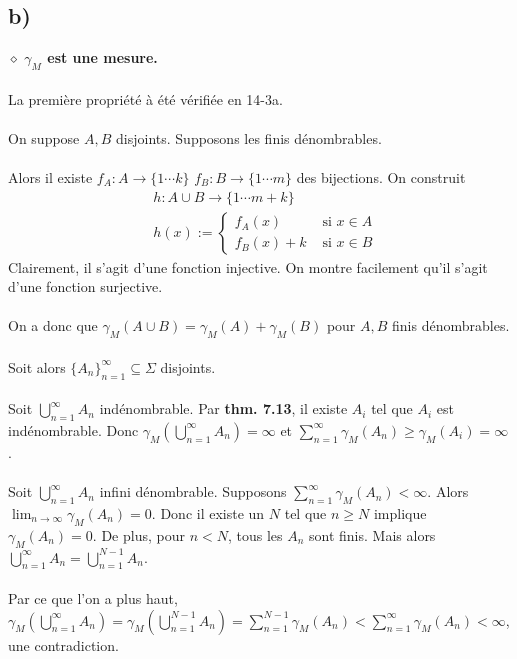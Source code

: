 \documentclass[a4paper,10pt]{article}
\begin{document}
\subsection*{b)}
$\diamond$ \textbf{$\gamma_M$ est une mesure.}
\\
\\
La première propriété à été vérifiée en 14-3a. 
\\
\\
On suppose $A,B$ disjoints. Supposons les finis dénombrables.
\\
\\
Alors il existe $f_A : A \rightarrow \{1 \cdots k\}$ $f_B : B \rightarrow \{1 \cdots m\}$ des bijections.  On construit
\begin{align*}
	& h : A\cup B \rightarrow \{1 \cdots m+k\} \\
	&h(x) := 
	\begin{cases}
		f_A(x) & \text{ si } x \in A \\
		f_B(x) + k & \text{ si } x \in B		
	\end{cases}
\end{align*} 
Clairement, il s'agit d'une fonction injective. On montre facilement qu'il s'agit d'une fonction surjective. 
\\
\\
On a donc que $\gamma_M (A \cup B) = \gamma_M (A) + \gamma_M (B)$ pour $A,B$ finis dénombrables.
\\
\\
Soit alors $\{A_n\}_{n=1}^\infty \subseteq \Sigma$ disjoints. 
\\
\\
Soit $\bigcup_{n=1}^\infty A_n$ indénombrable. Par \textbf{thm. 7.13}, il existe $A_i$ tel que $A_i$ est indénombrable. Donc $\gamma_M (\bigcup_{n=1}^\infty A_n) = \infty$ et $\sum_{n=1}^\infty \gamma_M (A_n) \geq \gamma_M (A_i) = \infty$.
\\
\\
Soit $\bigcup_{n=1}^\infty A_n$ infini dénombrable. Supposons $\sum_{n=1}^\infty \gamma_M (A_n) < \infty$. Alors $\lim_{n \to \infty} \gamma_M (A_n) = 0$. Donc il existe un $N$ tel que $n \geq N$ implique $\gamma_M (A_n) = 0$. De plus, pour $n < N$, tous les $A_n$ sont finis. Mais alors $\bigcup_{n=1}^\infty A_n = \bigcup_{n=1}^{N-1} A_n$. 
\\
\\
Par ce que l'on a plus haut, $\gamma_M (\bigcup_{n=1}^\infty A_n) = \gamma_M (\bigcup_{n=1}^{N-1} A_n ) = \sum_{n=1}^{N-1} \gamma_M (A_n) < \sum_{n=1}^\infty \gamma_M (A_n) < \infty$, une contradiction.
\end{document}
